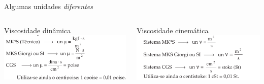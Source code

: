 \documentclass[t,%
brazilian,%
11pt,%
aspectratio=169,%
table%
]{beamer}
\begin{document}
\begin{frame}[c]{Algumas unidades \textit{diferentes}}
    \begin{columns}
        \begin{column}{0.45\textwidth}
            \centering
            Viscosidade dinâmica
            \includegraphics[width=\textwidth]{images/Captura de tela de 2025-03-26 16-53-52.png}
        \end{column}

        \begin{column}{0.45\textwidth}
            \centering
            Viscosidade cinemática
            \includegraphics[width=\textwidth]{images/Captura de tela de 2025-03-26 16-54-30.png}
        \end{column}
    \end{columns}
\end{frame}
\end{document}
